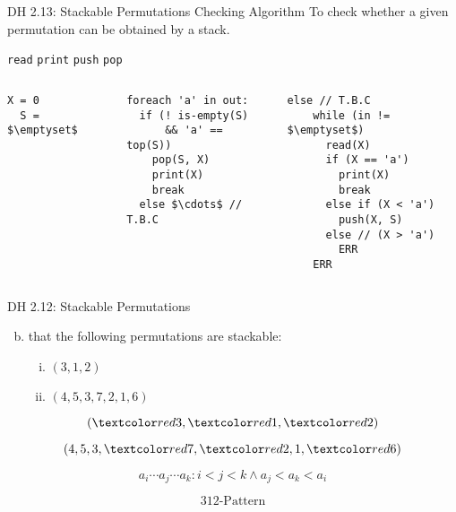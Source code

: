 \begin{frame}[fragile]{}
  \begin{exampleblock}{DH 2.13: Stackable Permutations Checking Algorithm}
    To check whether a given permutation can be obtained by a stack.

    \centerline{\texttt{read} \quad \texttt{print} \quad \texttt{push} \quad \texttt{pop} \quad {}}
  \end{exampleblock}


  \begin{columns}
      \begin{lstlisting}[style = Cstyle]
  X = 0
  S = $\emptyset$
      \end{lstlisting}

      \begin{lstlisting}[style = Cstyle]
foreach 'a' in out:
  if (! is-empty(S) 
      && 'a' == top(S))
    pop(S, X)
    print(X)
    break
  else $\cdots$ // T.B.C
      \end{lstlisting}
      \begin{lstlisting}[style = Cstyle]
  else // T.B.C
    while (in != $\emptyset$)
      read(X)
      if (X == 'a')
        print(X)
        break
      else if (X < 'a')
        push(X, S)
      else // (X > 'a')
        ERR
    ERR
      \end{lstlisting}
  \end{columns}
\end{frame}

\begin{frame}{}
  \begin{exampleblock}{DH 2.12: Stackable Permutations}
    \begin{enumerate}[(a)]
      \setcounter{enumi}{1}
    \item {} that the following permutations are \emph{} stackable:
	\begin{enumerate}[(i)]
	  \item $(3, 1, 2)$
	  \item $(4, 5, 3, 7, 2, 1, 6)$
	\end{enumerate}
    \end{enumerate}
  \end{exampleblock}

  \pause
  \[
    (\red{3}, \red{1}, \red{2})
  \]

  \[
    (4, 5, 3, \red{7}, \red{2}, 1, \red{6})
  \]

  \pause
  \[
    a_i \cdots a_j \cdots a_k: i < j < k \land a_j < a_k < a_i
  \]

  \pause
  \[
    312\text{-Pattern}
  \]
\end{frame}

